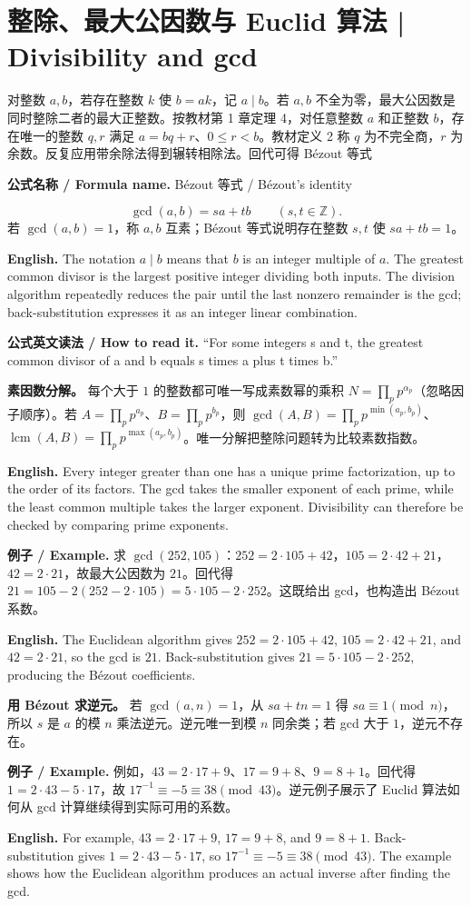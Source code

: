 \documentclass[UTF8,11pt,a4paper]{ctexart}
\newcommand{\EN}[1]{\par\noindent \textbf{English.} #1\par}
\newcommand{\FORMULA}[2]{\par\noindent\textbf{公式名称 / Formula name.} #1 / #2\par}
\newcommand{\READ}[1]{\par\noindent \textbf{公式英文读法 / How to read it.} #1\par}
\newcommand{\EX}[2]{\par\noindent \textbf{例子 / Example.} #1\par\EN{#2}}
\begin{document}
\section{整除、最大公因数与 Euclid 算法 | Divisibility and gcd}
\noindent 对整数 $a,b$，若存在整数 $k$ 使 $b=ak$，记 $a\mid b$。若 $a,b$ 不全为零，最大公因数是同时整除二者的最大正整数。按教材第 1 章定理 4，对任意整数 $a$ 和正整数 $b$，存在唯一的整数 $q,r$ 满足 $a=bq+r$、$0\le r<b$。教材定义 2 称 $q$ 为不完全商，$r$ 为余数。反复应用带余除法得到辗转相除法。回代可得 Bézout 等式
\FORMULA{Bézout 等式}{Bézout's identity}
\[
\gcd(a,b)=sa+tb\qquad(s,t\in\mathbb Z).
\]
若 $\gcd(a,b)=1$，称 $a,b$ 互素；Bézout 等式说明存在整数 $s,t$ 使 $sa+tb=1$。
\EN{The notation $a\mid b$ means that $b$ is an integer multiple of $a$. The greatest common divisor is the largest positive integer dividing both inputs. The division algorithm repeatedly reduces the pair until the last nonzero remainder is the gcd; back-substitution expresses it as an integer linear combination.}
\READ{“For some integers s and t, the greatest common divisor of a and b equals s times a plus t times b.”}

\noindent\textbf{素因数分解。} 每个大于 $1$ 的整数都可唯一写成素数幂的乘积 $N=\prod_p p^{\alpha_p}$（忽略因子顺序）。若 $A=\prod_p p^{a_p}$、$B=\prod_p p^{b_p}$，则 $\gcd(A,B)=\prod_p p^{\min(a_p,b_p)}$、$\operatorname{lcm}(A,B)=\prod_p p^{\max(a_p,b_p)}$。唯一分解把整除问题转为比较素数指数。
\EN{Every integer greater than one has a unique prime factorization, up to the order of its factors. The gcd takes the smaller exponent of each prime, while the least common multiple takes the larger exponent. Divisibility can therefore be checked by comparing prime exponents.}

\EX{求 $\gcd(252,105)$：$252=2\cdot105+42$，$105=2\cdot42+21$，$42=2\cdot21$，故最大公因数为 $21$。回代得 $21=105-2(252-2\cdot105)=5\cdot105-2\cdot252$。这既给出 gcd，也构造出 Bézout 系数。}{The Euclidean algorithm gives $252=2\cdot105+42$, $105=2\cdot42+21$, and $42=2\cdot21$, so the gcd is $21$. Back-substitution gives $21=5\cdot105-2\cdot252$, producing the Bézout coefficients.}

\noindent\textbf{用 Bézout 求逆元。} 若 $\gcd(a,n)=1$，从 $sa+tn=1$ 得 $sa\equiv1\pmod n$，所以 $s$ 是 $a$ 的模 $n$ 乘法逆元。逆元唯一到模 $n$ 同余类；若 gcd 大于 $1$，逆元不存在。
\EX{例如，$43=2\cdot17+9$、$17=9+8$、$9=8+1$。回代得 $1=2\cdot43-5\cdot17$，故 $17^{-1}\equiv-5\equiv38\pmod{43}$。逆元例子展示了 Euclid 算法如何从 gcd 计算继续得到实际可用的系数。}{For example, $43=2\cdot17+9$, $17=9+8$, and $9=8+1$. Back-substitution gives $1=2\cdot43-5\cdot17$, so $17^{-1}\equiv-5\equiv38\pmod{43}$. The example shows how the Euclidean algorithm produces an actual inverse after finding the gcd.}
\end{document}
